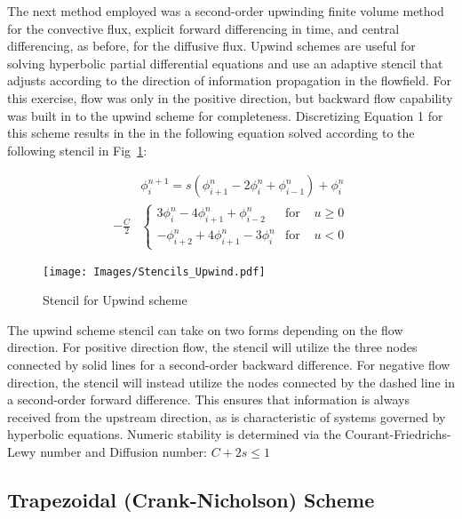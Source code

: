 \documentclass[twocolumn,10pt]{asme2ej}
\begin{document}
The next method employed was a second-order upwinding finite volume method for the convective flux, explicit forward differencing in time, and central differencing, as before, for the diffusive flux.  Upwind schemes are useful for solving hyperbolic partial differential equations and use an adaptive stencil that adjusts according to the direction of information propagation in the flowfield.  For this exercise, flow was only in the positive direction, but backward flow capability was built in to the upwind scheme for completeness.  Discretizing Equation 1 for this scheme results in the in the following equation solved according to the following stencil in Fig~\ref{Upwind}:

\begin{equation}
\begin{split}
&\phi^{n+1}_{i} =   s(\phi^{n}_{i+1} - 2\phi^{n}_{i} + \phi^{n}_{i-1}) + \phi^{n}_{i} \\ 
	  - \frac{C}{2}&\left\{ \begin{array}{lll}
        \mbox{$3\phi^{n}_{i} - 4\phi^{n}_{i+1} + \phi^{n}_{i-2}$} & \mbox{for } &u \geq 0 \\ 
        \mbox{$-\phi^{n}_{i+2} + 4\phi^{n}_{i+1} - 3\phi^{n}_{i}$} & \mbox{for } &u < 0 \end{array} \right.
\end{split}
\end{equation}

\vspace{-3em}
\begin{figure}[thb]
\begin{center}
\texttt{[image: Images/Stencils\_Upwind.pdf]}
\caption{Stencil for Upwind scheme}
\label{Upwind}
\end{center}
\end{figure}

The upwind scheme stencil can take on two forms depending on the flow direction.  For positive direction flow, the stencil will utilize the three nodes connected by solid lines for a second-order backward difference.  For negative flow direction, the stencil will instead utilize the nodes connected by the dashed line in a second-order forward difference.  This ensures that information is always received from the upstream direction, as is characteristic of systems governed by hyperbolic equations.  Numeric stability is determined via the Courant-Friedrichs-Lewy number and Diffusion number:   $C + 2s \leq 1$

\subsection{Trapezoidal (Crank-Nicholson) Scheme}
\end{document}
